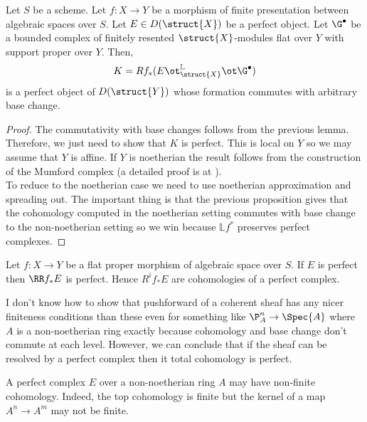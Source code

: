 \documentclass[12pt]{article}
\newcommand{\LL}{\mathbb{L}}
\begin{document}
\begin{prop}
Let $S$ be a scheme. Let $f : X \to Y$ be a morphism of finite presentation between algebraic spaces over $S$. Let $E \in D(\struct{X})$ be a perfect object. Let $\G^\bullet$ be a bounded complex of finitely resented $\struct{X}$-modules flat over $Y$ with support proper over $Y$. Then,
\[ K = R f_* (E \ot_{\struct{X}}^{\LL} \ot \G^\bullet) \]
is a perfect object of $D(\struct{Y})$ whose formation commutes with arbitrary base change. 
\end{prop}

\begin{proof}
The commutativity with base changes follows from the previous lemma. Therefore, we just need to show that $K$ is perfect. This is local on $Y$ so we may assume that $Y$ is affine. If $Y$ is noetherian the result follows from the construction of the Mumford complex (a detailed proof is at ). 
\bigskip\\
To reduce to the noetherian case we need to use noetherian approximation and spreading out. The important thing is that the previous proposition gives that the cohomology computed in the noetherian setting commutes with base change to the non-noetherian setting so we win because $\LL f^*$ preserves perfect complexes. 
\end{proof}

\begin{cor}
Let $f : X \to Y$ be a flat proper morphism of algebraic space over $S$. If $E$ is perfect then $\RR f_* E$ is perfect. Hence $R^i f_* E$ are cohomologies of a perfect complex.
\end{cor}

\begin{rmk}
I don't know how to show that pushforward of a coherent sheaf has any nicer finiteness conditions than these even for something like $\P^n_A \to \Spec{A}$ where $A$ is a non-noetherian ring exactly because cohomology and base change don't commute at each level. However, we can conclude that if the sheaf can be resolved by a perfect complex then it total cohomology is perfect. 
\end{rmk}

\begin{rmk}
A perfect complex $E$ over a non-noetherian ring $A$ may have non-finite cohomology. Indeed, the top cohomology is finite but the kernel of a map $A^n \to A^m$ may not be finite. 
\end{rmk}
\end{document}
